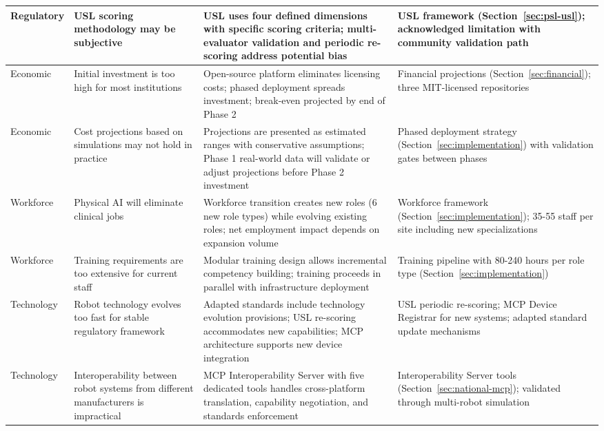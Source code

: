 \begin{longtable}{>{\raggedright\arraybackslash}p{2.2cm} >{\raggedright\arraybackslash}p{3.5cm} >{\raggedright\arraybackslash}p{4.5cm} >{\raggedright\arraybackslash}p{4.5cm}}
\midrule
Regulatory & USL scoring methodology may be subjective & USL uses four defined dimensions with specific scoring criteria; multi-evaluator validation and periodic re-scoring address potential bias & USL framework (Section~\ref{sec:psl-usl}); acknowledged limitation with community validation path \\
\midrule
Economic & Initial investment is too high for most institutions & Open-source platform eliminates licensing costs; phased deployment spreads investment; break-even projected by end of Phase 2 & Financial projections (Section~\ref{sec:financial}); three MIT-licensed repositories \cite{main-repo, mcp-repo, fl-repo} \\
\midrule
Economic & Cost projections based on simulations may not hold in practice & Projections are presented as estimated ranges with conservative assumptions; Phase 1 real-world data will validate or adjust projections before Phase 2 investment & Phased deployment strategy (Section~\ref{sec:implementation}) with validation gates between phases \\
\midrule
Workforce & Physical AI will eliminate clinical jobs & Workforce transition creates new roles (6 new role types) while evolving existing roles; net employment impact depends on expansion volume & Workforce framework (Section~\ref{sec:implementation}); 35-55 staff per site including new specializations \\
\midrule
Workforce & Training requirements are too extensive for current staff & Modular training design allows incremental competency building; training proceeds in parallel with infrastructure deployment & Training pipeline with 80-240 hours per role type (Section~\ref{sec:implementation}) \\
\midrule
Technology & Robot technology evolves too fast for stable regulatory framework & Adapted standards include technology evolution provisions; USL re-scoring accommodates new capabilities; MCP architecture supports new device integration & USL periodic re-scoring; MCP Device Registrar for new systems; adapted standard update mechanisms \\
\midrule
Technology & Interoperability between robot systems from different manufacturers is impractical & MCP Interoperability Server with five dedicated tools handles cross-platform translation, capability negotiation, and standards enforcement & Interoperability Server tools (Section~\ref{sec:national-mcp}); validated through multi-robot simulation \cite{site-docs} \\
\midrule

\end{longtable}
